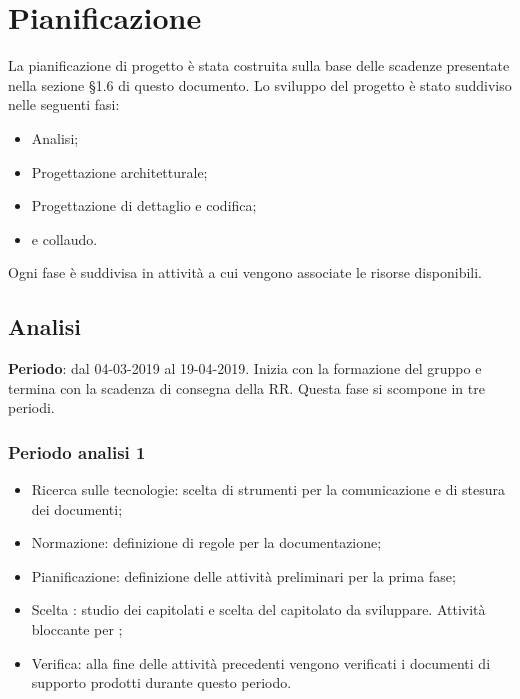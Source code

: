 \section{Pianificazione}
La pianificazione di progetto è stata costruita sulla base delle scadenze presentate nella sezione §1.6 di questo documento.
Lo sviluppo del progetto è stato suddiviso nelle seguenti fasi:
\begin{itemize}
    \item Analisi;
    \item Progettazione architetturale;
    \item Progettazione di dettaglio e codifica;
    \item {} e collaudo.
\end{itemize}
Ogni fase è suddivisa in attività a cui vengono associate le risorse disponibili.
    
    \subsection{Analisi}
    \textbf{Periodo}: dal 04-03-2019 al 19-04-2019. \newline
    Inizia con la formazione del gruppo e termina con la scadenza di consegna della RR.
    Questa fase si scompone in tre periodi.
        \subsubsection{Periodo analisi 1}
            \begin{itemize}
                \item Ricerca sulle tecnologie: scelta di strumenti per la comunicazione e di stesura dei documenti;
                \item Normazione: definizione di regole per la documentazione;
                \item Pianificazione: definizione delle attività preliminari per la prima fase;
                \item Scelta : studio dei capitolati e scelta del capitolato da sviluppare. Attività bloccante per \doc{\docNameAdR{}};
                \item Verifica: alla fine delle attività precedenti vengono verificati i documenti di supporto prodotti durante questo periodo.
            \end{itemize}

